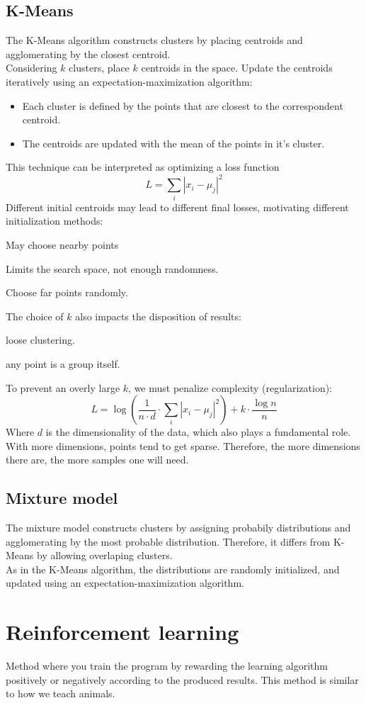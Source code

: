 \documentclass[11pt]{article}
\begin{document}
\subsection{K-Means}
\label{sec:org0ff4b6a}
The K-Means algorithm constructs clusters by placing centroids and agglomerating by the
closest centroid. \\
Considering \(k\) clusters, place \(k\) centroids in the space. Update the centroids
iteratively using an expectation-maximization algorithm:
\begin{itemize}[itemsep=0pt]
\item Each cluster is defined by the points that are closest to the correspondent centroid.
\item The centroids are updated with the mean of the points in it's cluster.
\end{itemize}
This technique can be interpreted as optimizing a loss function
\[
  L = \sum_i \left| x_i - \mu_j \right|^2
\]
Different initial centroids may lead to different final losses, motivating different
initialization methods:
\begin{description}[itemsep=0pt]
\item[{Random:}] May choose nearby points
\item[{Distance based:}] Limits the search space, not enough randomness.
\item[{Random and distance based:}] Choose far points randomly.
\end{description}
The choice of \(k\) also impacts the disposition of results:
\begin{description}[itemsep=0pt]
\item[{Small \(k\):}] loose clustering.
\item[{Large \(k\):}] any point is a group itself.
\end{description}
To prevent an overly large \(k\), we must penalize complexity (regularization):
\[
  L = \log \left( \frac{1}{n \cdot d} \cdot \sum_i \left| x_i - \mu_j \right|^2 \right) + k \cdot \frac{\log{n}}{n}
\]
Where \(d\) is the dimensionality of the data, which also plays a fundamental role. With
more dimensions, points tend to get sparse. Therefore, the more dimensions there are,
the more samples one will need.
\subsection{Mixture model}
\label{sec:orga98f74b}
The mixture model constructs clusters by assigning probabily distributions and
agglomerating by the most probable distribution. Therefore, it differs from K-Means by
allowing overlaping clusters. \\
As in the K-Means algorithm, the distributions are randomly initialized, and updated
using an expectation-maximization algorithm.
\section{Reinforcement learning}
\label{sec:orgbe468e6}
Method where you train the program by rewarding the learning algorithm positively or
negatively according to the produced results. This method is similar to how we teach
animals.
\end{document}
